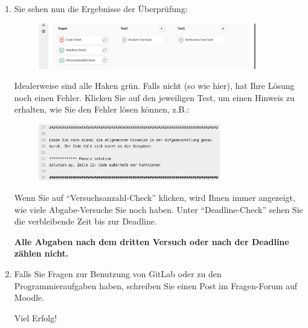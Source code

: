 \documentclass{scrartcl}
\begin{document}
\begin{enumerate}
		\vspace{3cm}
		
		\pagebreak
		
		\item Sie sehen nun die Ergebnisse der Überprüfung:
		
		\vfill
		
		\begin{figure}[h!]
			\centering
			\includegraphics[width=0.9\textwidth]{img/screenshot-pipeline-results.png}
		\end{figure}
		
		\vfill
		
		Idealerweise sind alle Haken grün. Falls nicht (so wie hier), hat Ihre Lösung noch einen Fehler. Klicken Sie auf den jeweiligen Test, um einen Hinweis zu erhalten, wie Sie den Fehler lösen können, z.B.:
		
		\vfill
		
		\begin{figure}[h!]
			\centering		
			\includegraphics[width=0.75\textwidth]{img/screenshot-hint.png}
		\end{figure}
		
		\vfill
		
		\begin{tcolorbox}[title=\faLightbulbO\space Hinweis,colbacktitle=hintboxcolor,colframe=hintboxcolor]
			Wenn Sie auf \enquote{Versuchsanzahl-Check} klicken, wird Ihnen immer angezeigt, wie viele Abgabe-Versuche Sie noch haben.
			Unter \enquote{Deadline-Check} sehen Sie die verbleibende Zeit bis zur Deadline.
			
			\bfseries Alle Abgaben nach dem dritten Versuch oder nach der Deadline zählen nicht.
		\end{tcolorbox}
	
		\vfill
		
		\item Falls Sie Fragen zur Benutzung von GitLab oder zu den Programmieraufgaben haben, schreiben Sie einen Post im Fragen-Forum auf Moodle.
		
		\vfill
		
		{\Huge Viel Erfolg!}
		
		\vspace{3cm}
	\end{enumerate}
\end{document}
